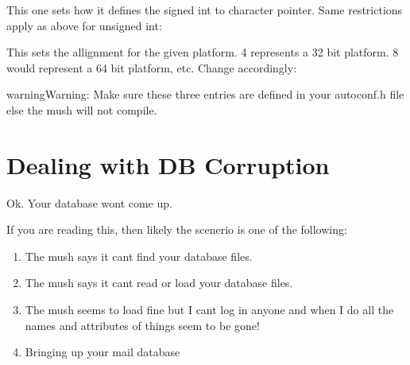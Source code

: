 \documentclass[letterpaper,10pt,english]{sphinxmanual}
\begin{document}
\sphinxAtStartPar
This one sets how it defines the signed int to character pointer.  Same
restrictions apply as above for unsigned int:

\begin{sphinxVerbatim}[commandchars=\\\{\}]
      
\end{sphinxVerbatim}

\sphinxAtStartPar
This sets the allignment for the given platform.  4 represents a 32 bit
platform.  8 would represent a 64 bit platform, etc.  Change accordingly:

\begin{sphinxVerbatim}[commandchars=\\\{\}]
\end{sphinxVerbatim}

\begin{sphinxadmonition}{warning}{Warning:}
\sphinxAtStartPar
Make sure these three entries are defined in your autoconf.h file else
the mush will not compile.
\end{sphinxadmonition}


\section{Dealing with DB Corruption}
\label{\detokenize{troubleshooting:dealing-with-db-corruption}}
\sphinxAtStartPar
Ok.  Your database won\textquotesingle{}t come up.

\sphinxAtStartPar
If you are reading this, then likely the scenerio is one of the following:
\begin{enumerate}
%
\item {} 
\sphinxAtStartPar
The mush says it can\textquotesingle{}t find your database files.

\item {} 
\sphinxAtStartPar
The mush says it can\textquotesingle{}t read or load your database files.

\item {} 
\sphinxAtStartPar
The mush seems to load fine but I can\textquotesingle{}t log in anyone and when I do
all the names and attributes of things seem to be gone!

\item {} 
\sphinxAtStartPar
Bringing up your mail database

\end{enumerate}
\end{document}
